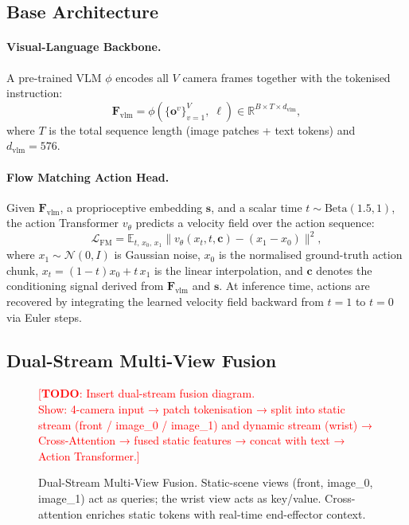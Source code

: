 \documentclass[10pt,twocolumn]{article}
\newcommand{\Fvlm}{\mathbf{F}_{\mathrm{vlm}}}
\newcommand{\cond}{\mathbf{c}}
\newcommand{\TODO}[1]{\textcolor{red}{[\textbf{TODO}: #1]}}
\begin{document}
\subsection{Base Architecture}
\label{sec:method:base}

\paragraph{Visual-Language Backbone.}
A pre-trained VLM $\phi$ encodes all $V$ camera frames together with the
tokenised instruction:
\begin{equation}
  \Fvlm = \phi\!\left(\{\mathbf{o}^v\}_{v=1}^{V},\; \ell\right)
  \in \mathbb{R}^{B \times T \times d_{\mathrm{vlm}}},
  \label{eq:vlm}
\end{equation}
where $T$ is the total sequence length (image patches + text tokens) and
$d_{\mathrm{vlm}}{=}576$.

\paragraph{Flow Matching Action Head.}
Given $\Fvlm$, a proprioceptive embedding $\mathbf{s}$, and a
scalar time $t \sim \mathrm{Beta}(1.5, 1)$, the action Transformer
$v_\theta$ predicts a velocity field over the action sequence:
\begin{equation}
  \mathcal{L}_{\mathrm{FM}} =
  \mathbb{E}_{t,\, x_0,\, x_1}
  \bigl\| v_\theta(x_t, t, \cond) - (x_1 - x_0) \bigr\|^2,
  \label{eq:fm}
\end{equation}
where $x_1 \sim \mathcal{N}(0,I)$ is Gaussian noise,
$x_0$ is the normalised ground-truth action chunk,
$x_t = (1{-}t)x_0 + t\,x_1$ is the linear interpolation,
and $\cond$ denotes the conditioning signal derived from $\Fvlm$ and $\mathbf{s}$.
At inference time, actions are recovered by integrating the learned velocity
field backward from $t{=}1$ to $t{=}0$ via Euler steps.


\subsection{Dual-Stream Multi-View Fusion}
\label{sec:method:ds}

\begin{figure}[t]
  \centering
  \TODO{Insert dual-stream fusion diagram.\\
        Show: 4-camera input → patch tokenisation → split into
        static stream (front / image\_0 / image\_1) and dynamic stream
        (wrist) → Cross-Attention → fused static features → concat with
        text → Action Transformer.}
  \caption{Dual-Stream Multi-View Fusion. Static-scene views (front,
    image\_0, image\_1) act as queries; the wrist view acts as key/value.
    Cross-attention enriches static tokens with real-time end-effector
    context.}
  \label{fig:dual_stream}
\end{figure}
\end{document}
